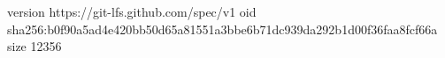 version https://git-lfs.github.com/spec/v1
oid sha256:b0f90a5ad4e420bb50d65a81551a3bbe6b71dc939da292b1d00f36faa8fcf66a
size 12356
